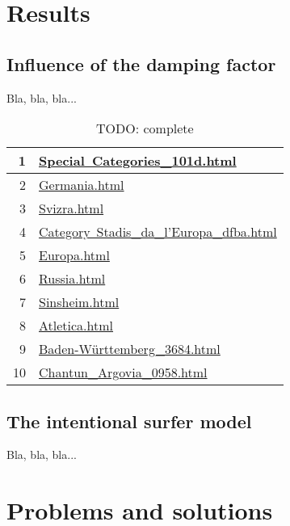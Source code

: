 \documentclass[pdftex,12pt,a4paper]{article}
\begin{document}
\section{Results}

\subsection{Influence of the damping factor}
Bla, bla, bla...

\begin{table}[h]
\centering
\begin{tabular}{ | r | l | }
\hline
1 & \href{http://rm.wikipedia.org/wiki/Special~Categories_101d.html}{Special~Categories\_101d.html} \\ \hline
2 & \href{http://rm.wikipedia.org/wiki/Germania.html}{Germania.html} \\ \hline
3 & \href{http://rm.wikipedia.org/wiki/Svizra.html}{Svizra.html} \\ \hline
4 & \href{http://rm.wikipedia.org/wiki/Category~Stadis_da_l'Europa_dfba.html}{Category~Stadis\_da\_l'Europa\_dfba.html} \\ \hline
5 & \href{http://rm.wikipedia.org/wiki/Europa.html}{Europa.html} \\ \hline
6 & \href{http://rm.wikipedia.org/wiki/Russia.html}{Russia.html} \\ \hline
7 & \href{http://rm.wikipedia.org/wiki/Sinsheim.html}{Sinsheim.html} \\ \hline
8 & \href{http://rm.wikipedia.org/wiki/Atletica.html}{Atletica.html} \\ \hline
9 & \href{http://rm.wikipedia.org/wiki/Baden-Württemberg_3684.html}{Baden-Württemberg\_3684.html} \\ \hline
10 & \href{http://rm.wikipedia.org/wiki/Chantun_Argovia_0958.html}{Chantun\_Argovia\_0958.html} \\ \hline
\end{tabular}
\caption{TODO: complete}
\end{table}


\subsection{The intentional surfer model}
Bla, bla, bla...


\section{Problems and solutions}
\end{document}
